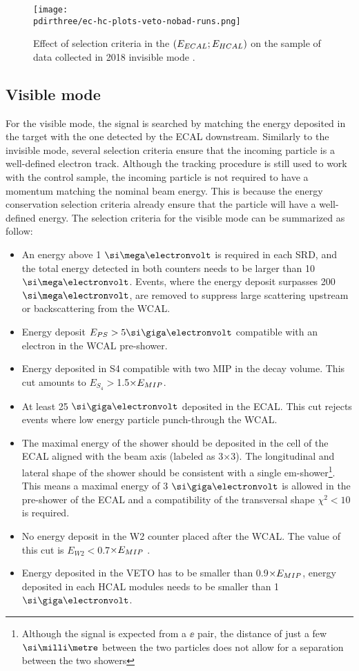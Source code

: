 \begin{figure}[bth!]
  \centering
   \texttt{[image: \\pdirthree/ec-hc-plots-veto-nobad-runs.png]}
  \caption[effect of the cuts in invisible mode]{Effect of selection criteria in the $(E_{ECAL};E_{HCAL})$ on the sample of data collected in 2018 invisible mode \cite{invis-cut-plot,NA64:2019imj}.}
  \label{fig:inv-cut-ehcal}
\end{figure}

\subsection{Visible mode}
\label{ch3:sec:selection-criteria-vis}

For the visible mode, the signal is searched by matching the energy deposited in the target with the one detected by the ECAL downstream. Similarly to the invisible mode, several selection criteria ensure that the incoming particle is a well-defined electron track. Although the tracking procedure is still used to work with the control sample, the incoming particle is not required to have a momentum matching the nominal beam energy. This is because the energy conservation selection criteria already ensure that the particle will have a well-defined energy. The selection criteria for the visible mode can be summarized as follow:

\begin{itemize}
\item An energy above 1 $\mev$ is required in each SRD, and the total energy detected in both counters needs to be larger than 10 $\mev$. Events, where the energy deposit surpasses 200 $\mev$, are removed to suppress large scattering upstream or backscattering from the WCAL.
\item Energy deposit $E_{PS} > 5 \gev$ compatible with an electron in the WCAL pre-shower.
\item Energy deposited in S4 compatible with two MIP in the decay volume. This cut amounts to $E_{S_4} > $1.5$\times E_{MIP}$.
\item At least 25 $\gev$ deposited in the ECAL. This cut rejects events where low energy particle punch-through the WCAL.
\item The maximal energy of the shower should be deposited in the cell of the ECAL aligned with the beam axis (labeled as 3$\times$3). The longitudinal and lateral shape of the shower should be consistent with a single em-shower\footnote{Although the signal is expected from a $\ee$ pair, the distance of just a few $\mmi$ between the two particles does not allow for a separation between the two showers}. This means a maximal energy of 3 $\gev$ is allowed in the pre-shower of the ECAL and a compatibility of the transversal shape $\chi^2 < 10$ is required.
\item  No energy deposit in the W2 counter placed after the WCAL. The value of this cut is $E_{W2} < $0.7$\times E_{MIP}$ \cite{Banerjee:2019hmi}.  
\item Energy deposited in the VETO has to be smaller than 0.9$\times E_{MIP}$, energy deposited in each HCAL modules needs to be smaller than 1 $\gev$.  
\end{itemize}

